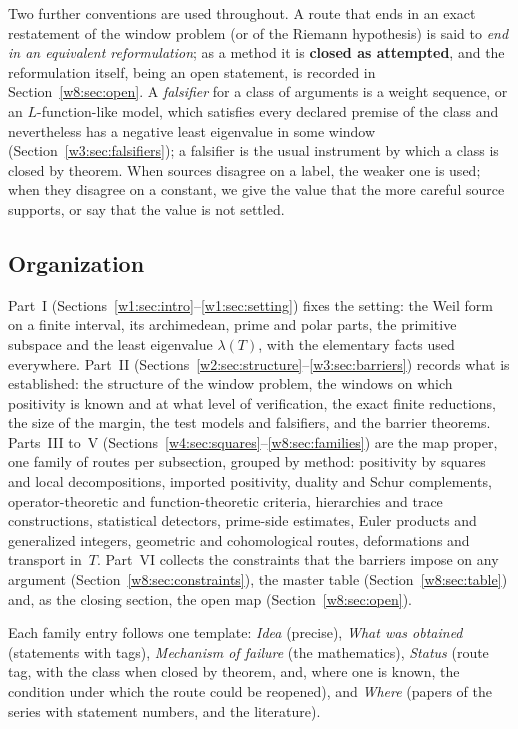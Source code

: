 \documentclass[11pt]{amsart}
\theoremstyle{definition}
\theoremstyle{remark}
\numberwithin{equation}{section}
\newcommand{\rtag}[1]{\textbf{\small\textsf{#1}}}
\newcommand{\closedA}{\rtag{closed as attempted}}
\begin{document}
Two further conventions are used throughout. A route that ends in an exact
restatement of the window problem (or of the Riemann hypothesis) is said to
\emph{end in an equivalent reformulation}; as a method it is
\closedA, and the reformulation itself, being an open statement, is recorded
in Section~\ref{w8:sec:open}. A \emph{falsifier} for a class of arguments is a
weight sequence, or an $L$-function-like model, which satisfies every
declared premise of the class and nevertheless has a negative least
eigenvalue in some window (Section~\ref{w3:sec:falsifiers}); a falsifier is
the usual instrument by which a class is closed by theorem. When sources
disagree on a label, the weaker one is used; when they disagree on a
constant, we give the value that the more careful source supports, or say that
the value is not settled.

\subsection{Organization}
Part~I (Sections~\ref{w1:sec:intro}--\ref{w1:sec:setting}) fixes the
setting: the Weil form on a finite interval, its archimedean, prime and polar
parts, the primitive subspace and the least eigenvalue $\lambda(T)$, with the
elementary facts used everywhere. Part~II
(Sections~\ref{w2:sec:structure}--\ref{w3:sec:barriers}) records what is
established: the structure of the window problem, the windows on which
positivity is known and at what level of verification, the exact finite
reductions, the size of the margin, the test models and falsifiers, and the
barrier theorems. Parts~III to~V
(Sections~\ref{w4:sec:squares}--\ref{w8:sec:families}) are the map proper,
one family of routes per subsection, grouped by method: positivity by squares
and local decompositions, imported positivity, duality and Schur complements,
operator-theoretic and function-theoretic criteria, hierarchies and trace
constructions, statistical detectors, prime-side estimates, Euler products and
generalized integers, geometric and cohomological routes, deformations and
transport in~$T$. Part~VI collects the constraints that the barriers impose
on any argument (Section~\ref{w8:sec:constraints}), the master table
(Section~\ref{w8:sec:table}) and, as the closing section, the open map
(Section~\ref{w8:sec:open}).

Each family entry follows one template: \emph{Idea} (precise),
\emph{What was obtained} (statements with tags), \emph{Mechanism of failure}
(the mathematics), \emph{Status} (route tag, with the class when closed by
theorem, and, where one is known, the condition under which the route could be
reopened), and \emph{Where} (papers of the series with statement numbers, and
the literature).
\end{document}
